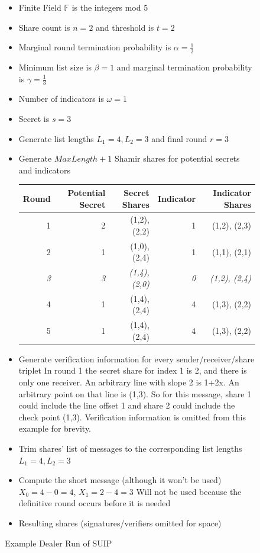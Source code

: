 \documentclass{dalcsthesis}
\begin{document}
\begin{figure}
  \caption{Example Dealer Run of SUIP}
  \label{Ex:SUIP}
  \begin{itemize}
    \item Finite Field $\mathbb{F}$ is the integers mod 5
    \item Share count is $n = 2$ and threshold is $t = 2$
    \item Marginal round termination probability is $\alpha = \frac{1}{2}$
    \item Minimum list size is $\beta = 1$ and marginal termination probability is $\gamma = \frac{1}{3}$
    \item Number of indicators is $\omega = 1$
    \item Secret is $s = 3$
    \item Generate list lengths $L_1 = 4, L_2 = 3$ and final round $r = 3$
    \item Generate $MaxLength+1$ Shamir shares for potential secrets and indicators
  
      \begin{tabular}{|r|r|r|r|r|}
      \hline
        Round & Potential Secret & Secret Shares & Indicator & Indicator Shares \\
      \hline
        1 & 2  & (1,2), (2,2) & 1 & (1,2), (2,3) \\
      \hline
        2 & 1  & (1,0), (2,4) & 1 & (1,1), (2,1) \\
      \hline
        \emph{3} & \emph{3}  & \emph{(1,4), (2,0)} & \emph{0} & \emph{(1,2), (2,4)} \\
      \hline
        4 & 1  & (1,4), (2,4) & 4 & (1,3), (2,2) \\
      \hline
        5 & 1  & (1,4), (2,4) & 4 & (1,3), (2,2) \\
      \hline
      \end{tabular}
      
    \item Generate verification information for every sender/receiver/share triplet
    \subitem In round 1 the secret share for index 1 is 2, and there is only one receiver. An arbitrary line with slope 2 is 1+2x. An arbitrary point on that line is (1,3). So for this message, share 1 could include the line offset 1 and share 2 could include the check point (1,3).
    \subitem Verification information is omitted from this example for brevity.
    
    \item Trim shares' list of messages to the corresponding list lengths $L_1 = 4, L_2 = 3$
    \item Compute the short message (although it won't be used)
    \subitem $X_0 = 4 - 0 = 4$, $X_1 = 2 - 4 = 3$
    \subitem Will not be used because the definitive round occurs before it is needed
    \item Resulting shares (signatures/verifiers omitted for space)
    

\end{itemize}
\end{figure}
\end{document}
